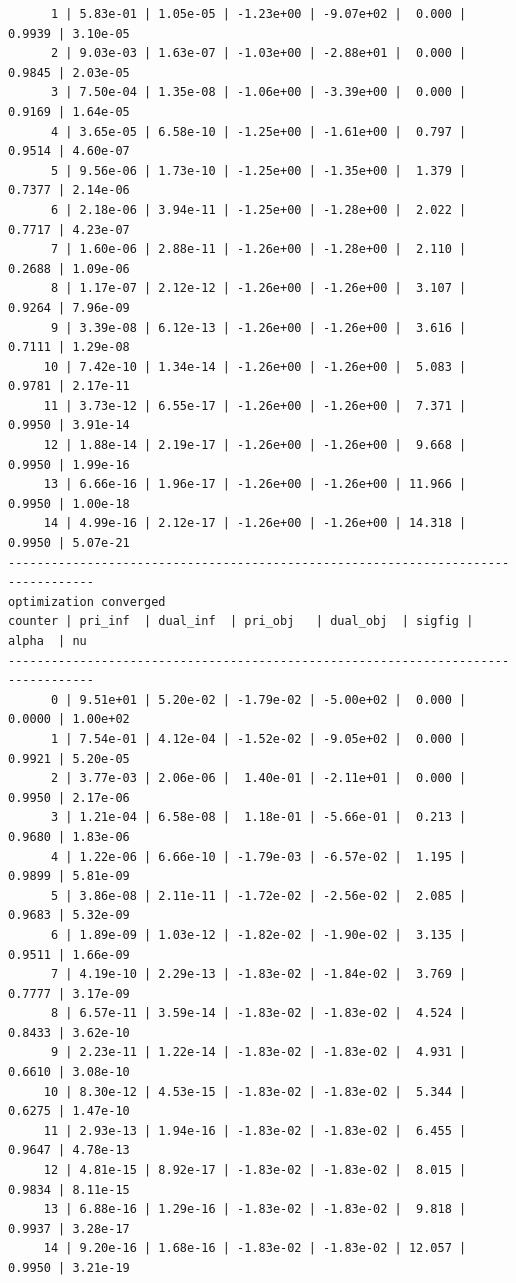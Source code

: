 \documentclass[
]{book}
\begin{document}
\begin{verbatim}
      1 | 5.83e-01 | 1.05e-05 | -1.23e+00 | -9.07e+02 |  0.000 | 0.9939 | 3.10e-05
      2 | 9.03e-03 | 1.63e-07 | -1.03e+00 | -2.88e+01 |  0.000 | 0.9845 | 2.03e-05
      3 | 7.50e-04 | 1.35e-08 | -1.06e+00 | -3.39e+00 |  0.000 | 0.9169 | 1.64e-05
      4 | 3.65e-05 | 6.58e-10 | -1.25e+00 | -1.61e+00 |  0.797 | 0.9514 | 4.60e-07
      5 | 9.56e-06 | 1.73e-10 | -1.25e+00 | -1.35e+00 |  1.379 | 0.7377 | 2.14e-06
      6 | 2.18e-06 | 3.94e-11 | -1.25e+00 | -1.28e+00 |  2.022 | 0.7717 | 4.23e-07
      7 | 1.60e-06 | 2.88e-11 | -1.26e+00 | -1.28e+00 |  2.110 | 0.2688 | 1.09e-06
      8 | 1.17e-07 | 2.12e-12 | -1.26e+00 | -1.26e+00 |  3.107 | 0.9264 | 7.96e-09
      9 | 3.39e-08 | 6.12e-13 | -1.26e+00 | -1.26e+00 |  3.616 | 0.7111 | 1.29e-08
     10 | 7.42e-10 | 1.34e-14 | -1.26e+00 | -1.26e+00 |  5.083 | 0.9781 | 2.17e-11
     11 | 3.73e-12 | 6.55e-17 | -1.26e+00 | -1.26e+00 |  7.371 | 0.9950 | 3.91e-14
     12 | 1.88e-14 | 2.19e-17 | -1.26e+00 | -1.26e+00 |  9.668 | 0.9950 | 1.99e-16
     13 | 6.66e-16 | 1.96e-17 | -1.26e+00 | -1.26e+00 | 11.966 | 0.9950 | 1.00e-18
     14 | 4.99e-16 | 2.12e-17 | -1.26e+00 | -1.26e+00 | 14.318 | 0.9950 | 5.07e-21
----------------------------------------------------------------------------------
optimization converged
counter | pri_inf  | dual_inf  | pri_obj   | dual_obj  | sigfig | alpha  | nu 
----------------------------------------------------------------------------------
      0 | 9.51e+01 | 5.20e-02 | -1.79e-02 | -5.00e+02 |  0.000 | 0.0000 | 1.00e+02
      1 | 7.54e-01 | 4.12e-04 | -1.52e-02 | -9.05e+02 |  0.000 | 0.9921 | 5.20e-05
      2 | 3.77e-03 | 2.06e-06 |  1.40e-01 | -2.11e+01 |  0.000 | 0.9950 | 2.17e-06
      3 | 1.21e-04 | 6.58e-08 |  1.18e-01 | -5.66e-01 |  0.213 | 0.9680 | 1.83e-06
      4 | 1.22e-06 | 6.66e-10 | -1.79e-03 | -6.57e-02 |  1.195 | 0.9899 | 5.81e-09
      5 | 3.86e-08 | 2.11e-11 | -1.72e-02 | -2.56e-02 |  2.085 | 0.9683 | 5.32e-09
      6 | 1.89e-09 | 1.03e-12 | -1.82e-02 | -1.90e-02 |  3.135 | 0.9511 | 1.66e-09
      7 | 4.19e-10 | 2.29e-13 | -1.83e-02 | -1.84e-02 |  3.769 | 0.7777 | 3.17e-09
      8 | 6.57e-11 | 3.59e-14 | -1.83e-02 | -1.83e-02 |  4.524 | 0.8433 | 3.62e-10
      9 | 2.23e-11 | 1.22e-14 | -1.83e-02 | -1.83e-02 |  4.931 | 0.6610 | 3.08e-10
     10 | 8.30e-12 | 4.53e-15 | -1.83e-02 | -1.83e-02 |  5.344 | 0.6275 | 1.47e-10
     11 | 2.93e-13 | 1.94e-16 | -1.83e-02 | -1.83e-02 |  6.455 | 0.9647 | 4.78e-13
     12 | 4.81e-15 | 8.92e-17 | -1.83e-02 | -1.83e-02 |  8.015 | 0.9834 | 8.11e-15
     13 | 6.88e-16 | 1.29e-16 | -1.83e-02 | -1.83e-02 |  9.818 | 0.9937 | 3.28e-17
     14 | 9.20e-16 | 1.68e-16 | -1.83e-02 | -1.83e-02 | 12.057 | 0.9950 | 3.21e-19

\end{verbatim}
\end{document}
